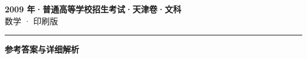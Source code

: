 \documentclass[zihao=5, a4paper]{ctexart}
\begin{document}
\begin{center}
  {\Large\bfseries 2009 年·普通高等学校招生考试·天津卷·文科}\\[4pt]
  {\large 数学 · 印刷版}
\end{center}
\medskip
{}

\par\bigskip\hrule\bigskip
{}
\begin{center}{\large\bfseries 参考答案与详细解析}\end{center}
\smallskip

\end{document}
